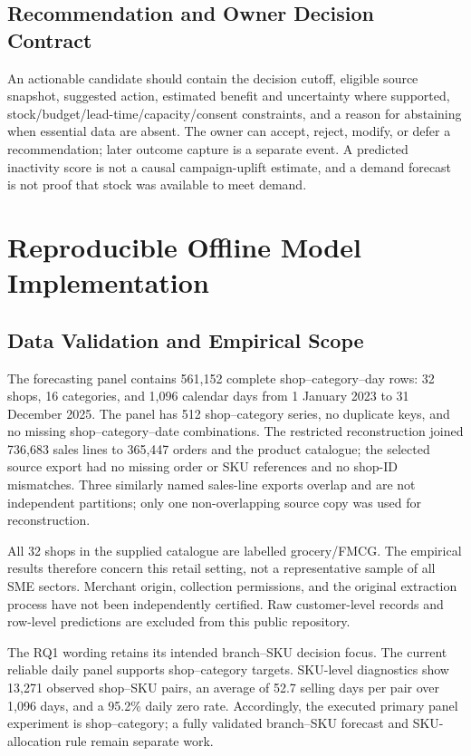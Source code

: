 \subsection{Recommendation and Owner Decision Contract}

An actionable candidate should contain the decision cutoff, eligible source snapshot, suggested action, estimated benefit and uncertainty where supported, stock/budget/lead-time/capacity/consent constraints, and a reason for abstaining when essential data are absent. The owner can accept, reject, modify, or defer a recommendation; later outcome capture is a separate event. A predicted inactivity score is not a causal campaign-uplift estimate, and a demand forecast is not proof that stock was available to meet demand.

\section{Reproducible Offline Model Implementation}
\subsection{Data Validation and Empirical Scope}

The forecasting panel contains 561,152 complete shop--category--day rows: 32 shops, 16 categories, and 1,096 calendar days from 1 January 2023 to 31 December 2025. The panel has 512 shop--category series, no duplicate keys, and no missing shop--category--date combinations. The restricted reconstruction joined 736,683 sales lines to 365,447 orders and the product catalogue; the selected source export had no missing order or SKU references and no shop-ID mismatches. Three similarly named sales-line exports overlap and are not independent partitions; only one non-overlapping source copy was used for reconstruction.

All 32 shops in the supplied catalogue are labelled grocery/FMCG. The empirical results therefore concern this retail setting, not a representative sample of all SME sectors. Merchant origin, collection permissions, and the original extraction process have not been independently certified. Raw customer-level records and row-level predictions are excluded from this public repository.

The RQ1 wording retains its intended branch--SKU decision focus. The current reliable daily panel supports shop--category targets. SKU-level diagnostics show 13,271 observed shop--SKU pairs, an average of 52.7 selling days per pair over 1,096 days, and a 95.2\% daily zero rate. Accordingly, the executed primary panel experiment is shop--category; a fully validated branch--SKU forecast and SKU-allocation rule remain separate work.

